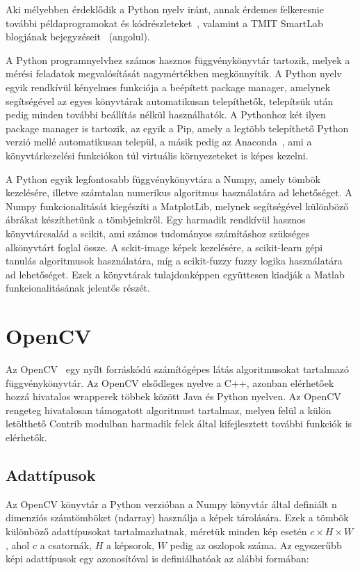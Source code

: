 \documentclass[12pt,a4paper,oneside]{report}             %
\begin{document}
Aki mélyebben érdeklődik a Python nyelv iránt, annak érdemes felkeresnie további példaprogramokat és kódrészleteket~\cite{gist}, valamint a TMIT SmartLab blogjának bejegyzéseit~\cite{smart1,smart2} (angolul). 

A Python programnyelvhez számos hasznos függvénykönyvtár tartozik, melyek a mérési feladatok megvalósítását nagymértékben megkönnyítik. A Python nyelv egyik rendkívül kényelmes funkciója a beépített package manager, amelynek segítségével az egyes könyvtárak automatikusan telepíthetők, telepítsük után pedig minden további beállítás nélkül használhatók. A Pythonhoz két ilyen package manager is tartozik, az egyik a Pip, amely a legtöbb telepíthető Python verzió mellé automatikusan települ, a másik pedig az Anaconda~\cite{conda}, ami a könyvtárkezelési funkciókon túl virtuális környezeteket is képes kezelni.

A Python egyik legfontosabb függvénykönyvtára a Numpy, amely tömbök kezelésére, illetve számtalan numerikus algoritmus használatára ad lehetőséget. A Numpy funkcionalitását kiegészíti a MatplotLib, melynek segítségével különböző ábrákat készíthetünk a tömbjeinkről. Egy harmadik rendkívül hasznos könyvtárcsalád a scikit, ami számos tudományos számításhoz szükséges alkönyvtárt foglal össze. A sckit-image képek kezelésére, a scikit-learn gépi tanulás algoritmusok használatára, míg a scikit-fuzzy fuzzy logika használatára ad lehetőséget. Ezek a könyvtárak tulajdonképpen együttesen kiadják a Matlab funkcionalitásának jelentős részét.

\section{OpenCV}

Az OpenCV~\cite{opencv} egy nyílt forráskódú számítógépes látás algoritmusokat tartalmazó függvénykönyvtár. Az OpenCV elsődleges nyelve a C++, azonban elérhetőek hozzá hivatalos wrapperek többek között Java és Python nyelven. Az OpenCV rengeteg hivatalosan támogatott algoritmust tartalmaz, melyen felül a külön letölthető Contrib modulban harmadik felek által kifejlesztett további funkciók is elérhetők.

\subsection{Adattípusok}

Az OpenCV könyvtár a Python verzióban a Numpy könyvtár által definiált n dimenziós számtömböket (ndarray) használja a képek tárolására. Ezek a tömbök különböző adattípusokat tartalmazhatnak, méretük minden kép esetén $c\times H\times W$, ahol $c$ a csatornák, $H$ a képsorok, $W$ pedig az oszlopok száma. Az egyszerűbb képi adattípusok egy azonosítóval is definiálhatóak az alábbi formában:
\end{document}
